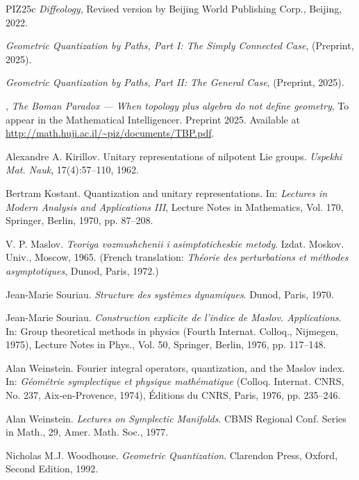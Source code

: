 \begin{thebibliography}{PIZ25c}
    \bysame %
    \emph{Diffeology},
    Revised version by Beijing World Publishing Corp., Beijing, 2022.
    
    \bysame %
    \emph{Geometric Quantization by Paths, Part I: The Simply Connected Case},
    (Preprint, 2025).
    
    \bysame %
    \emph{Geometric Quantization by Paths, Part II: The General Case},
    (Preprint, 2025).
    
    \bysame,
    \emph{The Boman Paradox --- When topology plus algebra do not define geometry},
    To appear in the Mathematical Intelligencer. Preprint 2025. Available at \url{http://math.huji.ac.il/~piz/documents/TBP.pdf}.
    
    Alexandre A. Kirillov.
    Unitary representations of nilpotent Lie groups.
    {\em Uspekhi Mat. Nauk}, 17(4):57--110, 1962.
    
    Bertram Kostant.
    Quantization and unitary representations.
    In: {\em Lectures in Modern Analysis and Applications III},
    Lecture Notes in Mathematics, Vol. 170,
    Springer, Berlin, 1970, pp. 87--208.
    
    V. P. Maslov.
    {\em Teoriya vozmushchenii i asimptoticheskie metody}.
    Izdat. Moskov. Univ., Moscow, 1965.
    (French translation: {\em Th\'eorie des perturbations et m\'ethodes asymptotiques}, Dunod, Paris, 1972.)
    
    Jean-Marie Souriau.
    {\em Structure des syst\`emes dynamiques}.
    Dunod, Paris, 1970.
    
    Jean-Marie Souriau.
    \newblock \emph{Construction explicite de l'indice de Maslov. Applications}.
    \newblock In: Group theoretical methods in physics (Fourth Internat. Colloq., Nijmegen, 1975), Lecture Notes in Phys., Vol. 50, Springer, Berlin, 1976, pp. 117--148.
    
    Alan Weinstein.
    Fourier integral operators, quantization, and the Maslov index.
    In: {\em G\'eom\'etrie symplectique et physique math\'ematique}
    (Colloq. Internat. CNRS, No. 237, Aix-en-Provence, 1974),
    \'Editions du CNRS, Paris, 1976, pp. 235--246.
    
    Alan Weinstein.
    \emph{Lectures on Symplectic Manifolds}.
    CBMS Regional Conf. Series in Math., 29, Amer. Math. Soc., 1977.
    
    Nicholas M.J. Woodhouse.
    \emph{Geometric Quantization}.
    Clarendon Press, Oxford, Second Edition, 1992.
    
  \end{thebibliography}
